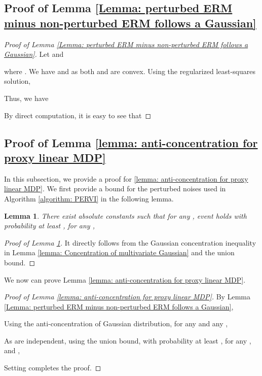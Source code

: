 \documentclass{article} \usepackage{iclr2023/iclr2023_conference,times}
\newtheorem{lemma}{Lemma}[section]
\begin{document}
\subsection{Proof of Lemma \ref{Lemma: perturbed ERM minus non-perturbed ERM follows a Gaussian}}

\begin{proof}[Proof of Lemma \ref{Lemma: perturbed ERM minus non-perturbed ERM follows a Gaussian}]
Let  and 

where  . 
We have 
and  as both  and  are convex. Using the regularized least-squares solution,  

Thus, we have

By direct computation, it is easy to see that 


\end{proof}

\subsection{Proof of Lemma \ref{lemma: anti-concentration for proxy linear MDP}}

In this subsection, we provide a proof for \ref{lemma: anti-concentration for proxy linear MDP}. We first provide a bound for the perturbed noises used in Algorithm \ref{algorithm: PERVI} in the following lemma.
\begin{lemma}
There exist absolute constants  such that for any , event  holds with probability at least , for any , 

\label{Lemma: good events where the noises are bounded}
\end{lemma}
\begin{proof}[Proof of Lemma \ref{Lemma: good events where the noises are bounded}]
It directly follows from the Gaussian concentration inequality in Lemma \ref{lemma: Concentration of multivariate Gaussian} and the union bound.
\end{proof}





We now can prove Lemma \ref{lemma: anti-concentration for proxy linear MDP}. 
\begin{proof}[Proof of Lemma \ref{lemma: anti-concentration for proxy linear MDP}]
By Lemma \ref{Lemma: perturbed ERM minus non-perturbed ERM follows a Gaussian}, 

Using the anti-concentration of Gaussian distribution, for any  and any , 

As  are independent, using the union bound, with probability at least , for any , and ,

Setting  completes the proof.
\end{proof}
\end{document}
